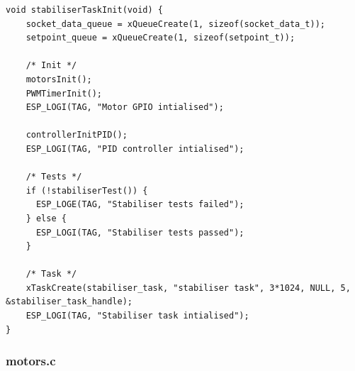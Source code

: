 \begin{lstlisting}
void stabiliserTaskInit(void) {
    socket_data_queue = xQueueCreate(1, sizeof(socket_data_t));
    setpoint_queue = xQueueCreate(1, sizeof(setpoint_t));

    /* Init */
    motorsInit();
    PWMTimerInit();
    ESP_LOGI(TAG, "Motor GPIO intialised");

    controllerInitPID();
    ESP_LOGI(TAG, "PID controller intialised");

    /* Tests */
    if (!stabiliserTest()) {
      ESP_LOGE(TAG, "Stabiliser tests failed");
    } else {
      ESP_LOGI(TAG, "Stabiliser tests passed");
    }

    /* Task */
    xTaskCreate(stabiliser_task, "stabiliser task", 3*1024, NULL, 5, &stabiliser_task_handle);
    ESP_LOGI(TAG, "Stabiliser task intialised");
}

\end{lstlisting}

\pagebreak
\subsubsection{motors.c}

